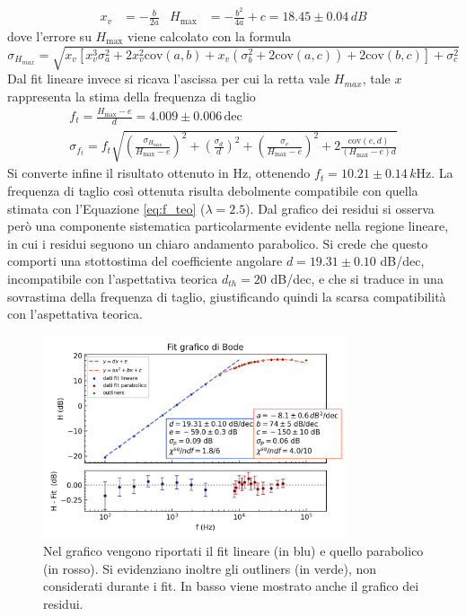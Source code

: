 \documentclass[a4paper,11pt]{article}
\begin{document}
\begin{align}
  \label{eq:4}
  x_v &= - \frac{b}{2a} & H_{\text{max}}&=-\frac{b^2}{4a}+c=18.45 \pm 0.04 \, \si{dB}
   \end{align}
dove l'errore su $H_\text{max}$ viene calcolato con la formula
\begin{equation}
\sigma_{H_{max}}  =\sqrt{x_v\left[x_v^3\sigma_a^2 + 2x_v^2\text{cov}(a,b)+  x_v(\sigma_b^2+2\text{cov}(a,c))+2\text{cov}(b,c)\right]+\sigma_c^2} 
\end{equation}
Dal fit lineare invece si ricava l'ascissa per cui la retta vale $H_{max}$, tale $x$ rappresenta la stima della frequenza di taglio
\begin{gather}
  \label{eq:5}
  f_{t} = \frac{H_{\text{max}} - e}{d}=4.009\pm0.006 \, \text{dec}\\ 
  \sigma_{f_{t}} = f_t\sqrt{  \left( \frac{\sigma_{H_{\text{max}}}}{H_{\text{max}}-e}\right)^2 + 
	  \left( \frac{\sigma_d}{d}\right)^2 + 
	  \left( \frac{\sigma_e}{H_{\text{max}}-e}\right)^2 + 
  2 \frac{\text{cov}(e,d)}{(H_\text{max}-e)d}}
\end{gather}
Si converte infine il risultato ottenuto in $\si{\Hz}$, ottenendo 
$f_{t}=10.21\pm0.14 \,\si{k\Hz}$.
La frequenza di taglio così ottenuta risulta debolmente compatibile con
quella stimata con l'Equazione \ref{eq:f_teo} ($\lambda=2.5$). Dal grafico dei residui si osserva però una componente sistematica
particolarmente evidente nella regione lineare, in cui i residui seguono un chiaro andamento
parabolico. Si crede che questo comporti una stottostima del coefficiente angolare $d=19.31 \pm 0.10$ dB/dec, incompatibile con l'aspettativa teorica $d_{th}=20$ dB/dec, e che si traduce in una sovrastima della frequenza di taglio, giustificando quindi la scarsa compatibilità con l'aspettativa teorica.
\begin{figure}[h]
\centering
\includegraphics[width=0.8\textwidth]{images/fit_bode}
\caption{\footnotesize Nel grafico vengono riportati il fit lineare (in blu) e quello parabolico (in rosso). Si evidenziano inoltre gli outliners (in verde), non considerati durante i fit. In basso viene mostrato anche il grafico dei residui.}\label{fig:fit_bode}
\end{figure}
\end{document}
